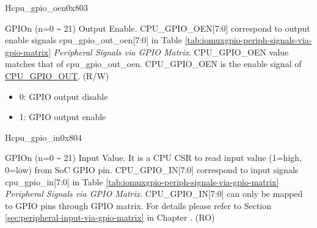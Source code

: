 \begin{register}{H}{cpu\_gpio\_oen}{0x803}\label{regdesc:GPIO_OEN}
%
%
%
%
%
%
%
%
%
\regnewline%
\begin{regdesc}\begin{reglist}
\label{fielddesc:GPIO_OEN}\item [CPU\_GPIO\_OEN] GPIOn (n=0 \verb+~+ 21) Output Enable. CPU\_GPIO\_OEN[7:0] correspond to output enable signals cpu\_gpio\_out\_oen[7:0] in Table \ref{tab:iomuxgpio-periph-signals-via-gpio-matrix} \textit{Peripheral Signals via GPIO Matrix}. CPU\_GPIO\_OEN value matches that of cpu\_gpio\_out\_oen.
\newline CPU\_GPIO\_OEN is the enable signal of \hyperref[fielddesc:GPIO_OUT]{CPU\_GPIO\_OUT}. (R/W)

\begin{itemize}
    \setlength\itemsep{-1em}
    \item 0: GPIO output disable
    \item 1: GPIO output enable
\end{itemize}
\end{reglist}\end{regdesc}
\end{register}

\begin{register}{H}{cpu\_gpio\_in}{0x804}\label{regdesc:GPIO_IN}
%
%
%
%
%
%
%
%
%
\regnewline%
\begin{regdesc}\begin{reglist}
\label{fielddesc:GPIO_IN}\item [CPU\_GPIO\_IN] GPIOn (n=0 \verb+~+ 21) Input Value. It is a CPU CSR to read input value (1=high, 0=low) from SoC GPIO pin.
\newline CPU\_GPIO\_IN[7:0] correspond to input signals cpu\_gpio\_in[7:0] in Table \ref{tab:iomuxgpio-periph-signals-via-gpio-matrix} \textit{Peripheral Signals via GPIO Matrix}.
\newline CPU\_GPIO\_IN[7:0] can only be mapped to GPIO pins through GPIO matrix. For details please refer to Section \ref{sec:peripheral-input-via-gpio-matrix} in Chapter \textit{}. (RO)
\end{reglist}\end{regdesc}
\end{register}



